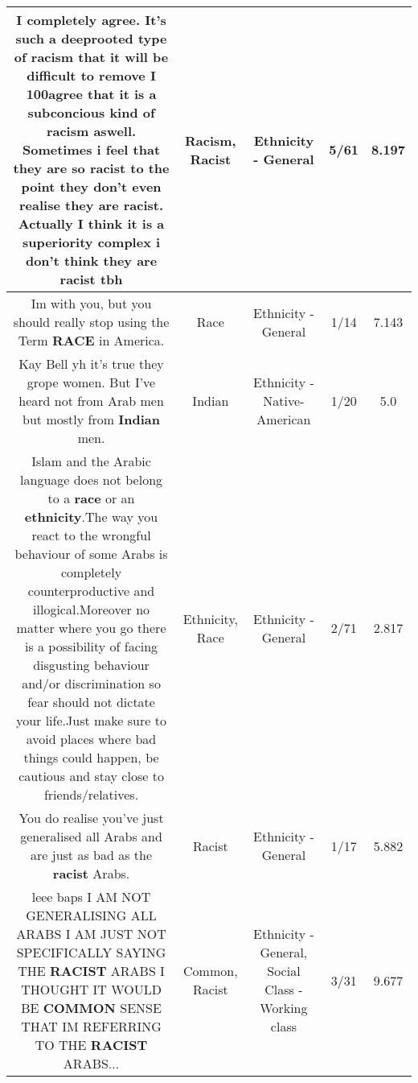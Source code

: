 \documentclass[11pt]{article}
\newlength\mylength
\begin{document}
\begin{center}
\begin{longtable}{|C{.65\mylength}|C{.30\mylength}|C{.12\mylength}|C{.12\mylength}|C{.12\mylength}|}
  \small I completely agree. It's such a deeprooted type of \textbf{racism} that it will be difficult to remove I 100agree that it is a subconcious kind of \textbf{racism} aswell. Sometimes i feel that they are so \textbf{racist} to the point they don't even realise they are \textbf{racist}. Actually I think it is a superiority complex i don't think they are \textbf{racist} tbh\normalsize   & Racism, Racist & Ethnicity - General & 5/61 & 8.197 \\  \hline
  \small Im with you, but you should really stop using the Term \textbf{RACE} in America.\normalsize   & Race & Ethnicity - General & 1/14 & 7.143 \\  \hline
  \small Kay Bell yh it's true they grope women. But I've heard not from Arab men but mostly from \textbf{Indian} men.\normalsize   & Indian & Ethnicity - Native-American & 1/20 & 5.0 \\  \hline
  \small Islam and the Arabic language does not belong to a \textbf{race} or an \textbf{ethnicity}.The way you react to the wrongful behaviour of some Arabs is completely counterproductive and illogical.Moreover no matter where you go there is a possibility of facing disgusting behaviour and/or discrimination so fear should not dictate your life.Just make sure to avoid places where bad things could happen, be cautious and stay close to friends/relatives.\normalsize   & Ethnicity, Race & Ethnicity - General & 2/71 & 2.817 \\  \hline
  \small You do realise you've just generalised all Arabs and are just as bad as the \textbf{racist} Arabs.\normalsize   & Racist & Ethnicity - General & 1/17 & 5.882 \\  \hline
  \small leee baps I AM NOT GENERALISING ALL ARABS I AM JUST NOT SPECIFICALLY SAYING THE \textbf{RACIST} ARABS I THOUGHT IT WOULD BE \textbf{COMMON} SENSE THAT IM REFERRING TO THE \textbf{RACIST} ARABS...\normalsize   & Common, Racist & Ethnicity - General, Social Class - Working class & 3/31 & 9.677 \\  \hline

\end{longtable}
\end{center}
\end{document}
